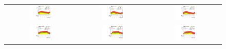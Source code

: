  \begin{figure}[tbh!]
 \begin{center}
 \begin{tabular}{ccc}
 \includegraphics[width=0.33\textwidth]{figures/Part4/Evt/LFVemuM}&
 \includegraphics[width=0.33\textwidth]{figures/Part4/Evt/LFVetaM}&
 \includegraphics[width=0.33\textwidth]{figures/Part4/Evt/LFVmutaM}\\
 \includegraphics[width=0.33\textwidth]{figures/Part4/Evt/LFVemuDr}&
 \includegraphics[width=0.33\textwidth]{figures/Part4/Evt/LFVetaDr}&
 \includegraphics[width=0.33\textwidth]{figures/Part4/Evt/LFVmutaDr}\\

\end{tabular}
\end{center}
\end{figure}
